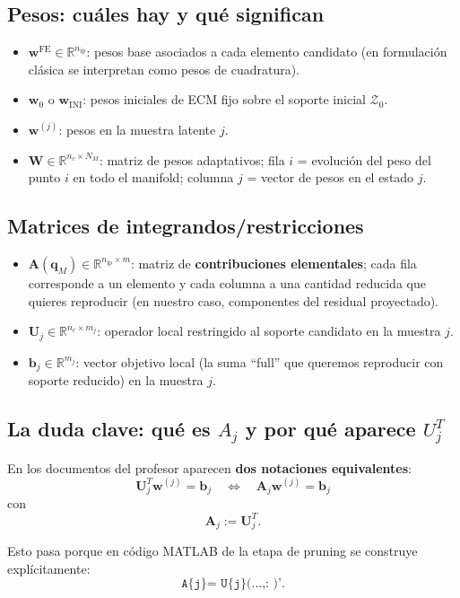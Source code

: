 \documentclass[11pt,a4paper]{article}
\newcommand{\W}{\bm W}
\newcommand{\A}{\bm A}
\newcommand{\U}{\bm U}
\begin{document}
\subsection{Pesos: cu\'ales hay y qu\'e significan}
\begin{itemize}[leftmargin=0.8cm]
    \item $\bm w^{\text{FE}}\in\mathbb R^{n_{\text{ip}}}$:
    pesos base asociados a cada elemento candidato (en formulaci\'on cl\'asica se interpretan como pesos de cuadratura).
    \item $\bm w_0$ o $\bm w_{\text{INI}}$:
    pesos iniciales de ECM fijo sobre el soporte inicial $\mathcal Z_0$.
    \item $\bm w^{(j)}$:
    pesos en la muestra latente $j$.
    \item $\W\in\mathbb R^{n_c\times N_M}$:
    matriz de pesos adaptativos; fila $i$ = evoluci\'on del peso del punto $i$ en todo el manifold; columna $j$ = vector de pesos en el estado $j$.
\end{itemize}

\subsection{Matrices de integrandos/restricciones}
\begin{itemize}[leftmargin=0.8cm]
    \item $\A(\bm q_M)\in\mathbb R^{n_{\text{ip}}\times m}$:
    matriz de \textbf{contribuciones elementales}; cada fila corresponde a un elemento y cada columna a una cantidad reducida que quieres reproducir (en nuestro caso, componentes del residual proyectado).
    \item $\U_j\in\mathbb R^{n_c\times m_j}$:
    operador local restringido al soporte candidato en la muestra $j$.
    \item $\bm b_j\in\mathbb R^{m_j}$:
    vector objetivo local (la suma ``full'' que queremos reproducir con soporte reducido) en la muestra $j$.
\end{itemize}

\subsection{La duda clave: qu\'e es $A_j$ y por qu\'e aparece $U_j^T$}
En los documentos del profesor aparecen \textbf{dos notaciones equivalentes}:
\[
\U_j^T \bm w^{(j)} = \bm b_j
\quad\Longleftrightarrow\quad
\A_j \bm w^{(j)} = \bm b_j
\]
con
\[
\A_j := \U_j^T.
\]

Esto pasa porque en c\'odigo MATLAB de la etapa de pruning se construye
expl\'icitamente:
\[
\texttt{A\{j\} = U\{j\}(...,: )'}.
\]
\end{document}
